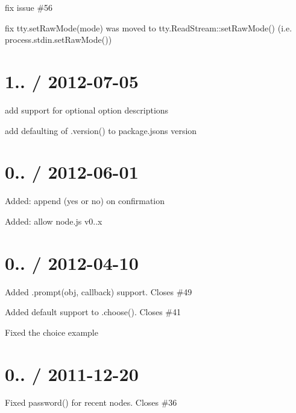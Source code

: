\begin{DoxyItemize}
\item fix issue \#56
\item fix tty.\+set\+Raw\+Mode(mode) was moved to tty.\+Read\+Stream\+::set\+Raw\+Mode() (i.\+e. process.\+stdin.\+set\+Raw\+Mode())
\end{DoxyItemize}

\section*{1.. / 2012-\/07-\/05 }


\begin{DoxyItemize}
\item add support for optional option descriptions
\item add defaulting of {\ttfamily .version()} to package.\+json\textquotesingle{}s version
\end{DoxyItemize}

\section*{0.. / 2012-\/06-\/01 }


\begin{DoxyItemize}
\item Added\+: append (yes or no) on confirmation
\item Added\+: allow node.\+js v0..\+x
\end{DoxyItemize}

\section*{0.. / 2012-\/04-\/10 }


\begin{DoxyItemize}
\item Added {\ttfamily .prompt(obj, callback)} support. Closes \#49
\item Added default support to .choose(). Closes \#41
\item Fixed the choice example
\end{DoxyItemize}

\section*{0.. / 2011-\/12-\/20 }


\begin{DoxyItemize}
\item Fixed {\ttfamily password()} for recent nodes. Closes \#36
\end{DoxyItemize}


